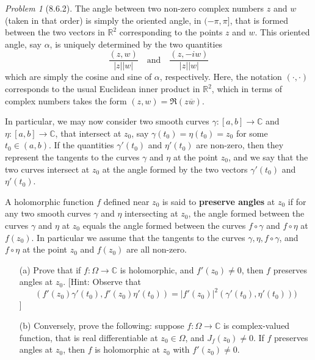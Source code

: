 \documentclass[10pt]{article}
\newcommand{\sk}{\vskip 10mm}
\newcommand{\bb}[1]{\mathbb{#1}}
\newcommand{\conj}[1]{\overline{#1}}
\theoremstyle{remark}
\newtheorem{problem}{Problem}
\theoremstyle{remark}
\begin{document}
\sk

\begin{problem}[8.6.2]
  The angle between two non-zero complex numbers $z$ and $w$ (taken in that
  order) is simply the oriented angle, in $(-\pi,\pi]$, that is formed between
  the two vectors in $\bb{R}^2$ corresponding to the points $z$ and $w$. This
  oriented angle, say $\alpha$, is uniquely determined by the two quantities
  \[
    \frac{(z,w)}{|z||w|}\quad\text{and}\quad \frac{(z,-iw)}{|z||w|}
  \]
  which are simply the cosine and sine of $\alpha$, respectively. Here, the
  notation $(\cdot,\cdot)$ corresponds to the usual Euclidean inner product in
  $\bb{R}^2$, which in terms of complex numbers takes the form
  $(z,w)=\Re(z\conj{w})$.

  In particular, we may now consider two smooth curves
  $\gamma:[a,b]\rightarrow\bb{C}$ and $\eta:[a,b]\rightarrow\bb{C}$, that
  intersect at $z_0$, say $\gamma(t_0)=\eta(t_0)=z_0$ for some
  $t_0\in(a,b)$. If the quantities $\gamma'(t_0)$ and $\eta'(t_0)$ are
  non-zero, then they represent the tangents to the curves $\gamma$ and
  $\eta$ at the point $z_0$, and we say that the two curves intersect at
  $z_0$ at the angle formed by the two vectors $\gamma'(t_0)$ and $\eta'(t_0)$.

  A holomorphic function $f$ defined near $z_0$ is said to
  \textbf{preserve angles} at $z_0$ if for any two smooth curves $\gamma$ and
  $\eta$ intersecting at $z_0$, the angle formed between the curves $\gamma$ and
  $\eta$ at $z_0$ equals the angle formed between the curves $f\circ\gamma$
  and $f\circ\eta$ at $f(z_0)$. In particular we assume that the tangents to
  the curves $\gamma,\eta,f\circ\gamma$, and $f\circ\eta$ at the point $z_0$ and
  $f(z_0)$ are all non-zero.
  \begin{enumerate}
  \item[(a)] Prove that if $f:\Omega\rightarrow\bb{C}$ is holomorphic, and
    $f'(z_0)\neq 0$, then $f$ preserves angles at $z_0$. [Hint: Observe that
    \[
      (f'(z_0)\gamma'(t_0),f'(z_0)\eta'(t_0))=|f'(z_0)|^2(\gamma'(t_0),\eta'(t_0)))
    \]
      ]
    \item[(b)] Conversely, prove the following: suppose
      $f:\Omega\rightarrow\bb{C}$ is complex-valued function, that is real
      differentiable at $z_0\in\Omega$, and $J_f(z_0)\neq 0$. If $f$ preserves
      angles at $z_0$, then $f$ is holomorphic at $z_0$ with $f'(z_0)\neq 0$.
  \end{enumerate}
\end{problem}
\end{document}
